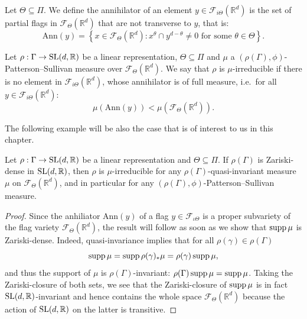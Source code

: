 \documentclass{report}
\begin{document}
\begin{definition}
    Let $\Theta \subseteq \Pi$.
    We define the annihilator of an element $y \in \mathcal F_{i \Theta}(\mathbb R^d)$ is the set of partial flags in $\mathcal F_\Theta(\mathbb R^d)$ that are not transverse to $y$, that is:
    \[
        \mathrm{Ann}(y) = \left\{ x \in \mathcal F_{\Theta}(\mathbb R^d) : x^\theta \cap y^{d- \theta} \neq 0 \text{ for some } \theta \in \Theta \right\}.
    \]    
\end{definition}

\begin{definition}
    \label{def:mu_irreducible}
Let $\rho: \Gamma \to \operatorname{{\mathrm{SL}}}(d,\mathbb R)$ be a linear representation, $\Theta \subseteq \Pi$ and $\mu$ a $(\rho(\Gamma), \phi)$-Patterson--Sullivan measure over $\mathcal F_\Theta(\mathbb R^d)$.
We say that $\rho$ is $\mu$-irreducible if there is no element in $\mathcal F_{i \Theta}(\mathbb R^d)$, whose annihilator is of full measure, i.e.\ for all $y \in \mathcal F_{i \Theta}(\mathbb R^d)$:
\[
    \mu(\mathrm{Ann}(y)) < \mu(\mathcal F_{\Theta}(\mathbb R^d)).
\]
\end{definition}

The following example will be also the case that is of interest to us in this chapter.
\begin{example}\label{ex:ZariskiDense}
    Let $\rho: \Gamma \to \operatorname{{\mathrm{SL}}}(d,\mathbb R)$ be a linear representation and $\Theta \subseteq \Pi$.
    If $\rho(\Gamma)$ is Zariski-dense in $\operatorname{{\mathrm{SL}}} (d, \mathbb R)$, then $\rho$ is $\mu$-irreducible for any $\rho(\Gamma)$-quasi-invariant measure $\mu$ on $\mathcal F_\Theta(\mathbb R^d)$, and in particular for any $(\rho(\Gamma), \phi)$-Patterson--Sullivan measure.
\end{example}
\begin{proof}
    Since the anhiliator $\mathrm{Ann}(y)$ of a flag $y \in \mathcal F_{\iota \Theta}$ is a proper subvariety of the flag variety $\mathcal F_{\Theta} (\mathbb R^d)$, the result will follow as soon as we show that $\operatorname{supp} \mu$ is Zariski-dense.
    Indeed, quasi-invariance implies that for all $\rho(\gamma) \in \rho(\Gamma)$
    \[
    \operatorname{supp} \mu = \operatorname{supp} \rho(\gamma)_* \mu = \rho(\gamma) \operatorname{supp} \mu,
    \]
    and thus the support of $\mu$ is $\rho(\Gamma)$-invariant: $\rho(\Gamma) \operatorname{supp} \mu = \operatorname{supp} \mu$.
    Taking the Zariski-closure of both sets, we see that the Zariski-closure of $\operatorname{supp} \mu$ is in fact $\operatorname{{\mathrm{SL}}}(d, \mathbb R)$-invariant and hence contains the whole space $\mathcal F_\Theta(\mathbb R^d)$ because the action of $\operatorname{{\mathrm{SL}}}(d, \mathbb R)$ on the latter is transitive.
\end{proof}
\end{document}
